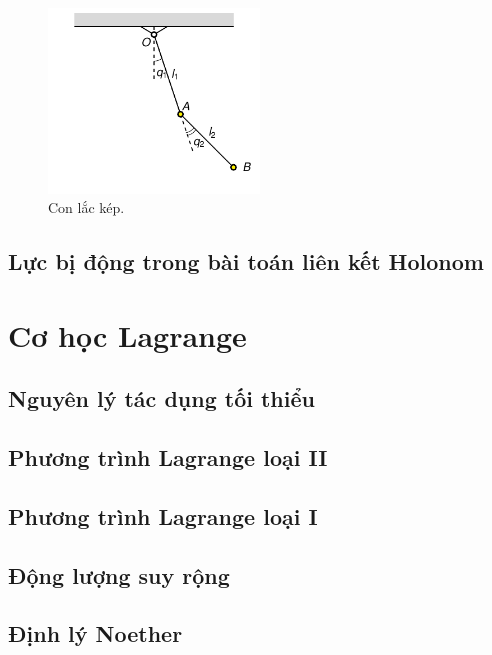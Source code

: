 \begin{figure}[!h]
    \centering
    \includegraphics[width=0.5\textwidth]{Tuan9/Figures/Double_Pendulum/Double_Pendulum.pdf}
    \caption{Con lắc kép.}
    \label{fig:Double_Pendulum}
\end{figure}

\subsection{Lực bị động trong bài toán liên kết Holonom}


\section{Cơ học Lagrange}

\subsection{Nguyên lý tác dụng tối thiểu}

\subsection{Phương trình Lagrange loại II}

\subsection{Phương trình Lagrange loại I}

\subsection{Động lượng suy rộng}

\subsection{Định lý Noether}


